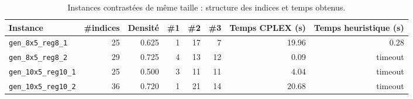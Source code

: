 \begingroup
\small
\setlength{\tabcolsep}{4pt}
\begin{table}[H]
\centering
\caption{Instances contrastées de même taille : structure des indices et temps obtenus.}
\label{tab:palisade-contrast}
\begin{tabular}{lrrrrrrr}
\toprule
Instance & \#indices & Densité & \#1 & \#2 & \#3 & Temps CPLEX (s) & Temps heuristique (s)\\
\midrule
\texttt{gen\_8x5\_reg8\_1} & 25 & 0.625 & 1 & 17 & 7 & 19.96 & 0.28\\
\texttt{gen\_8x5\_reg8\_2} & 29 & 0.725 & 4 & 13 & 12 & 0.09 & timeout\\
\texttt{gen\_10x5\_reg10\_1} & 25 & 0.500 & 3 & 11 & 11 & 4.04 & timeout\\
\texttt{gen\_10x5\_reg10\_2} & 36 & 0.720 & 1 & 21 & 14 & 20.68 & timeout\\
\bottomrule
\end{tabular}
\end{table}
\endgroup
